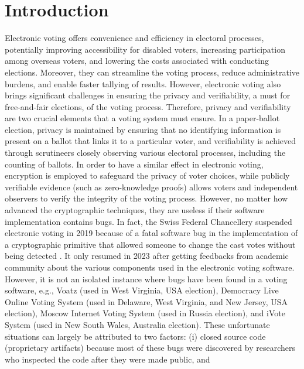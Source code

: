 \documentclass[sigconf, anonymous]{acmart}
\begin{document}
\section{Introduction}
Electronic voting offers convenience and efficiency in electoral processes, potentially improving 
accessibility for disabled voters, increasing participation among overseas voters, and lowering 
the costs associated with conducting elections. Moreover,
they can streamline the voting process, reduce administrative burdens, and enable 
faster tallying of results. However, electronic voting also brings significant 
challenges in ensuring the privacy and verifiability, a must for free-and-fair elections, of the voting process. Therefore, 
privacy and verifiability are two crucial elements that a voting system must ensure.
In a paper-ballot election, privacy is maintained by 
ensuring that no identifying information is present on a ballot that links it to a particular voter, 
and verifiability is achieved through scrutineers closely observing various electoral processes, 
including the counting of ballots. In order to have a similar effect in electronic voting, encryption 
is employed to safeguard the privacy of voter choices, while publicly verifiable evidence 
(such as zero-knowledge proofs) allows voters and independent observers to verify the integrity of 
the voting process. However, no matter how advanced the cryptographic techniques, they are useless 
if their software implementation contains bugs. In fact, 
the Swiss Federal Chancellery suspended electronic voting in 2019 because of 
a fatal software bug in the implementation of a cryptographic primitive 
that allowed someone to change the cast votes without being detected \cite{9152765}.
It only resumed in 2023 after getting feedbacks from academic 
community \cite{swiss_evoting_chronik} about the various components used in 
the electronic voting software. However, it is not an isolated  
instance where bugs have been found in a voting software, e.g., 
Voatz \cite{255334} (used in West Virginia, USA election),
Democracy Live Online Voting System \cite{263858} 
(used in Delaware, West Virginia, and New Jersey, USA election), 
Moscow Internet Voting System \cite{10.1007/978-3-030-51280-4_3}
(used in Russia election), and iVote System \cite{10.1007/978-3-319-22270-7_3, 10.1145/3014812.3014837} 
(used in New South Wales, Australia election). 
These unfortunate situations can largely be attributed to two factors: 
(i) closed source code (proprietary artifacts) because most of these bugs were 
discovered by researchers who inspected the code after they were made public, and 
\end{document}
